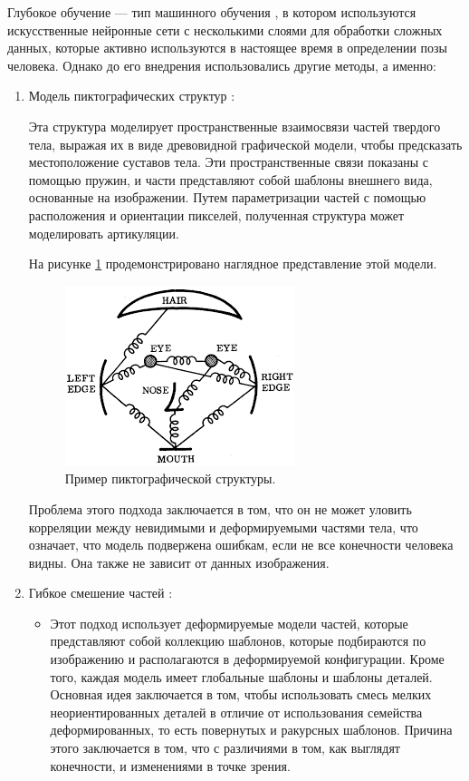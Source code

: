Глубокое обучение --- тип машинного обучения \cite{vyugin}, в котором используются искусственные нейронные сети с несколькими слоями для обработки сложных данных, которые активно используются в настоящее время в определении позы человека. Однако до его внедрения использовались другие методы, а именно: 
\begin{enumerate}[label=\arabic*)]
 	\item Модель пиктографических структур \cite{polygraphic}:
 	
 		Эта структура моделирует пространственные взаимосвязи частей твердого тела, выражая их в виде древовидной графической модели, чтобы предсказать местоположение суставов тела. 
 		Эти пространственные связи показаны с помощью пружин, и части представляют собой шаблоны внешнего вида, основанные на изображении. 
 		Путем параметризации частей с помощью расположения и ориентации пикселей, полученная структура может моделировать артикуляции. 
 		
 		На рисунке \ref{img:polygraphic} продемонстрировано наглядное представление этой модели.
 		\begin{figure}[ht!]
 			\centering
 			\includegraphics[width=0.4\linewidth]{assets/poly.png}
 			\caption{Пример пиктографической структуры.}
 			\label{img:polygraphic}
 		\end{figure}
 		
 		
 		Проблема этого подхода заключается в том, что он не может уловить корреляции между невидимыми и деформируемыми частями тела, что означает, что модель подвержена ошибкам, если не все конечности человека видны. 
 		Она также не зависит от данных изображения.
 		

 	\item Гибкое смешение частей \cite{FPE}:
 		
 		\begin{itemize}
 			\item Этот подход использует деформируемые модели частей, которые представляют собой коллекцию шаблонов, которые подбираются по изображению и располагаются в деформируемой конфигурации. 
 			Кроме того, каждая модель имеет глобальные шаблоны и шаблоны деталей. 
 			Основная идея заключается в том, чтобы использовать смесь мелких неориентированных деталей в отличие от использования семейства деформированных, то есть повернутых и ракурсных шаблонов.
 			Причина этого заключается в том, что с различиями в том, как выглядят конечности, и изменениями в точке зрения.
 			

\end{itemize}
\end{enumerate}
